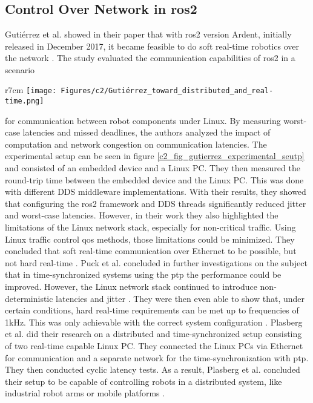 \chapter{}
\label{sec:state_of_the_art}
\section{Control Over Network in \gls{ros2}}
Gutiérrez et al. showed in their paper that with \gls{ros2} version Ardent, initially released in December 2017, it became feasible to do soft real-time robotics over the network \cite{gutierrez_towards_2018}. The study evaluated the communication capabilities of \gls{ros2} in a scenario
\begin{wrapfigure}{r}{7cm}
\texttt{[image: Figures/c2/Gutiérrez\_toward\_distributed\_and\_real-time.png]}
\caption{The experimental setup used by Gutiérrez et al. to evaluate the real-time performance of \gls{ros2} communication over Ethernet. Figure taken from \cite{gutierrez_towards_2018}.} \label{c2_fig_gutierrez_experimental_seutp}
\end{wrapfigure}
for communication between robot components under Linux. By measuring worst-case latencies and missed deadlines, the authors analyzed the impact of computation and network congestion on communication latencies. The experimental setup can be seen in figure \ref{c2_fig_gutierrez_experimental_seutp} and consisted of an embedded device and a Linux PC. They then measured the round-trip time between the embedded device and the Linux PC. This was done with different DDS middleware implementations. With their results, they showed that configuring the \gls{ros2} framework and DDS threads significantly reduced jitter and worst-case latencies. However, in their work they also highlighted the limitations of the Linux network stack, especially for non-critical traffic. Using Linux traffic control \gls{qos} methods, those limitations could be minimized. They concluded that soft real-time communication over Ethernet to be possible, but not hard real-time \cite{gutierrez_towards_2018}. \newline
Puck et al. concluded in further investigations on the subject that in time-synchronized systems using the \gls{ptp} the performance could be improved. However, the Linux network stack continued to introduce non-deterministic latencies and jitter \cite{puck_distributed_2020}. They were then even able to show that, under certain conditions, hard real-time requirements can be met up to frequencies of 1kHz. This was only achievable with the correct system configuration \cite{puck_performance_2021}.\newline
Plasberg et al. did their research on a distributed and time-synchronized setup consisting of two real-time capable Linux PC. They connected the Linux PCs via Ethernet for communication and a separate network for the time-synchronization with \gls{ptp}. They then conducted cyclic latency tests. As a result, Plasberg et al. concluded their setup to be capable of controlling robots in a distributed system, like industrial robot arms or mobile platforms \cite{plasberg_towards_2022}.
